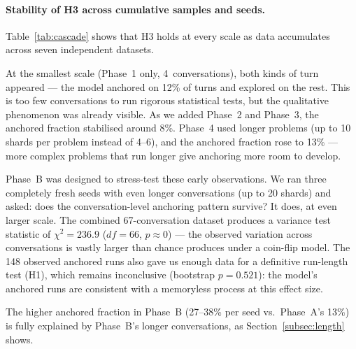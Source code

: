 \documentclass{article}
\begin{document}
\paragraph{Stability of H3 across cumulative samples and seeds.}
\label{subsec:stability}

Table~\ref{tab:cascade} shows that H3 holds at every scale as
data accumulates across seven independent datasets.

At the smallest scale (Phase~1 only, 4~conversations), both kinds
of turn appeared --- the model anchored on 12\% of turns and
explored on the rest.
This is too few conversations to run rigorous statistical tests,
but the qualitative phenomenon was already visible.
As we added Phase~2 and Phase~3, the anchored fraction stabilised
around 8\%.
Phase~4 used longer problems (up to 10 shards per problem instead
of 4--6), and the anchored fraction rose to 13\% --- more
complex problems that run longer give anchoring more room to develop.

Phase~B was designed to stress-test these early observations.
We ran three completely fresh seeds with even longer conversations
(up to 20 shards) and asked: does the conversation-level anchoring pattern survive?
It does, at even larger scale.
The combined 67-conversation dataset produces a variance test
statistic of $\chi^2 = 236.9$ ($df=66$, $p\approx 0$) ---
the observed variation across conversations is vastly larger than
chance produces under a coin-flip model.
The 148 observed anchored runs also gave us enough data for a
definitive run-length test (H1), which remains inconclusive
(bootstrap $p=0.521$): the model's anchored runs are consistent
with a memoryless process at this effect size.

The higher anchored fraction in Phase~B (27--38\% per seed vs.\
Phase~A's 13\%) is fully explained by Phase~B's longer
conversations, as Section~\ref{subsec:length} shows.
\end{document}
